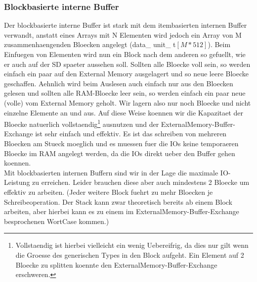 \documentclass[10pt,a4paper]{article}
\begin{document}
\subsubsection{Blockbasierte interne Buffer}
Der blockbasierte interne Buffer ist stark mit dem itembasierten internen Buffer verwandt, anstatt eines Arrays mit N Elementen wird jedoch ein Array von M zusammenhaengenden Bloecken angelegt (data\_ unit\_ t$[M*512]$). Beim Einfuegen von Elementen wird nun ein Block nach dem anderen so gefuellt, wie er auch auf der SD spaeter aussehen soll. Sollten alle Bloecke voll sein, so werden einfach ein paar auf den External Memory ausgelagert und so neue leere Bloecke geschaffen.  Aehnlich wird beim Auslesen auch einfach nur aus den Bloecken gelesen und sollten alle RAM-Bloecke leer sein, so werden einfach ein paar neue (volle) vom External Memory geholt. Wir lagern also nur noch Bloecke und nicht einzelne Elemente an und aus. Auf diese Weise koennen wir die Kapazitaet der Bloecke natuerlich vollstaendig\footnote{Vollstaendig ist hierbei vielleicht ein wenig Uebereifrig, da dies nur gilt wenn die Groesse des generischen Types in den Block aufgeht. Ein Element auf 2 Bloecke zu splitten koennte den ExternalMemory-Buffer-Exchange erschweren.} ausnutzen und der ExternalMemory-Buffer-Exchange ist sehr einfach und effektiv. Es ist das schreiben von mehreren Bloecken am Stueck moeglich und es muessen fuer die IOs keine temporaeren Bloecke im RAM angelegt werden, da die IOs direkt ueber den Buffer gehen koennen.\\
Mit blockbasierten internen Buffern sind wir in der Lage die maximale IO-Leistung zu erreichen. Leider brauchen diese aber auch mindestens 2 Bloecke um effektiv zu arbeiten. (Jeder weitere Block fuehrt zu mehr Bloecken je Schreibeoperation. Der Stack kann zwar theoretisch bereits ab einem Block arbeiten, aber hierbei kann es zu einem im ExternalMemory-Buffer-Exchange besprochenen WortCase kommen.)
\end{document}
